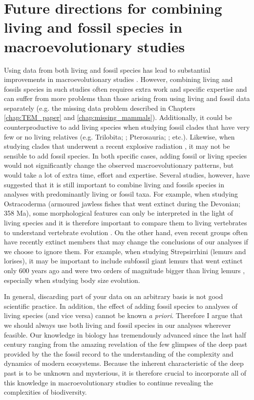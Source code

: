 \section{Future directions for combining living and fossil species in macroevolutionary studies}
Using data from both living and fossil species has lead to substantial improvements in macroevolutionary studies \citep{Finarelli2006,Slateretal2012,Slater2012MEE,SlaterPennel2014,pant2014complex,Mitchell2015}. %
However, combining living and fossils species in such studies often requires extra work and specific expertise \citep[e.g.][]{ronquista2012} %
 and can suffer from more problems than those arising from using living and fossil data separately (e.g. the missing data problem described in Chapters \ref{chap:TEM_paper} and \ref{chap:missing_mammals}).
Additionally, it could be counterproductive to add living species when studying fossil clades that have very few or no living relatives (e.g. Trilobita; \citealt{hopkinsdecoupling2013}; Pterosauria; \citealt{Butler2012}; etc.).
Likewise, when studying clades that underwent a recent explosive radiation \citep[e.g. Cichlidae;][]{Genner01052007}, it may not be sensible to add fossil species.
In both specific cases, adding fossil or living species would not significantly change the observed macroevolutionary patterns, but would take a lot of extra time, effort and expertise.
Several studies, however, have suggested that it is still important to combine living and fossils species in analyses with predominantly living or fossil taxa.
For example, when studying Ostracoderma (armoured jawless fishes that went extinct during the Devonian; 358 Ma), some morphological features can only be interpreted in the light of living species and it is therefore important to compare them to living vertebrates to understand vertebrate evolution \citep{Janvier2015}.
On the other hand, even recent groups often have recently extinct members that may change the conclusions of our analyses if we choose to ignore them.
For example, when studying Strepsirrhini (lemurs and lorises), it may be important to include subfossil giant lemurs that went extinct only 600 years ago and were two orders of magnitude bigger than living lemurs \citep{goodman2003introduction}, especially when studying body size evolution.

In general, discarding part of your data on an arbitrary basis is not good scientific practice. 
In addition, the effect of adding fossil species to analyses of living species (and vice versa) cannot be known \textit{a priori}.
Therefore I argue that we should always use both living and fossil species in our analyses wherever feasible.
Our knowledge in biology has tremendously advanced since the last half century ranging from the amazing revelation of the few glimpses of the deep past provided by the the fossil record to the understanding of the complexity and dynamics of modern ecosystems.
Because the inherent characteristic of the deep past is to be unknown and mysterious, it is therefore crucial to incorporate all of this knowledge in macroevolutionary studies to continue revealing the complexities of biodiversity.


%